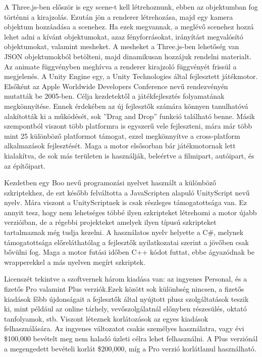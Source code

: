 A Three.js-ben először is egy scene-t kell létrehoznunk, ebben az objektumban fog történni a kirajzolás. Ezután jön a renderer létrehozása, majd egy kamera objektum hozzáadása a scenehez. Ha ezek megvannak, a meglévő scenehez hozzá lehet adni a kívánt objektumokat, azaz fényforrásokat, irányítást megvalósító objektumokat, valamint mesheket. A mesheket a Three.js-ben lehetőség van JSON objektumokból betölteni, majd dinamikusan hozzájuk rendelni materialt. Az animate függvényben meghívva a renderer kirajzoló függvényét frissül a megjelenés.
A Unity Engine egy, a Unity Technologies által fejlesztett játékmotor. Elsőként az Apple Worldwide Developers Conference nevű rendezvényén mutatták be 2005-ben. Célja kezdetektől a játékfejlesztés folyamatának megkönnyítése. Ennek érdekében az új fejlesztők számára könnyen tanulhatóvá alakították ki a működését, sok ''Drag and Drop'' funkció található benne. Másik szempontból viszont több platformra is egyszerű vele fejleszteni, mára már több mint 25 különböző platformot támogat, ezzel megkönnyítve a cross-platform alkalmazások fejlesztését. Maga a motor elsősorban bár játékmotornak lett kialakítva, de sok más területen is használják, beleértve a filmipart, autóipart, és az építőipart.

Kezdetben egy Boo nevű programozási nyelvet használt a különböző szkriptekhez, de ezt később felváltotta a JavaScripten alapuló UnityScript nevű nyelv. Mára viszont a UnityScriptnek is csak részleges támogatottsága van. Ez annyit tesz, hogy nem lehetséges többé ilyen szkripteket létrehozni a motor újabb verzióiban, de a régebbi projekteket amelyek ilyen típusú szkripteket tartalmaznak még tudja kezelni. A használatos nyelv helyette a C\#, melynek támogatottsága előreláthatólag a fejlesztők nyilatkozatai szerint a jövőben csak bővülni fog. Maga a motor futási időben C++ kódot futtat, ebbe ágyazódnak be wrapperekkel a más nyelven megírt szkriptek.

Licenszét tekintve a szoftvernek három kiadása van: az ingyenes Personal, és a fizetős Pro valamint Plus verziók.Ezek között sok különbség nincsen, a fizetős kiadások főbb újdonságait a fejlesztők által nyújtott plusz szolgáltatások teszik ki, mint például az online tárhely, vevőszolgálatnál előnyben részesülés, oktató tanfolyamok, stb. Viszont léteznek korlátozások az egyes kiadások felhasználására. Az ingyenes változatot csakis személyes használatra, vagy évi \$100,000 bevételt meg nem haladó üzleti célra lehet felhasználni. A Plus verziónál a megengedett bevételi korlát \$200,000, míg a Pro verzió korlátlanul használható.

